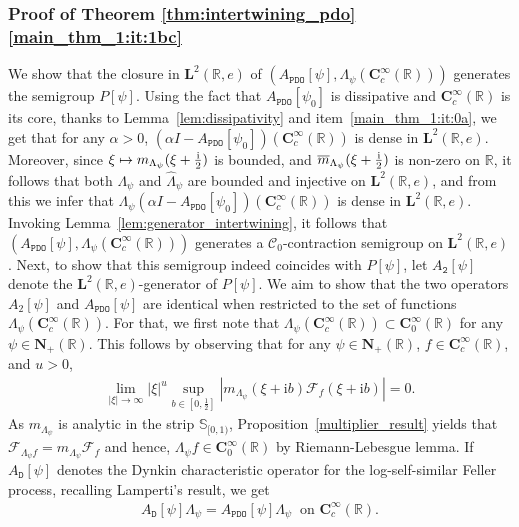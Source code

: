 \documentclass[12pt]{amsart}
\newcommand{\hptg}[2]{\hypertarget{#1}{#2}}
\numberwithin{equation}{section}
\newcommand{\bb}{\mathbb}
\newcommand{\cc}{\mathcal}
\newcommand{\ttt}{\mathtt}
\newcommand{\bmrm}[2][2]{\mathbf{#2}^{#1}}
\newcommand{\fou}{\mathcal{F}}
\newcommand{\C}{\mathbf{C}}
\renewcommand{\i}{\mathrm{i}}
\newcommand{\LRe}{\bmrm{L}(\bb{R},e)}
\theoremstyle{definition}
\theoremstyle{assump}
\theoremstyle{remark}
\begin{document}
{\subsubsection{Proof of Theorem \ref{thm:intertwining_pdo}\eqref{main_thm_1:it:1bc}}
 We  show that the closure in $\LRe$ of $(A_\ttt{PDO}[\psi],\Lambda_\psi(\C^\infty_c(\bb R)))$ generates the semigroup $P[\psi]$. Using the fact that $A_\ttt{PDO}[\psi_0]$ is dissipative and $\C^\infty_c(\bb{R})$ is its core, thanks to Lemma~\ref{lem:dissipativity} and item~\ref{main_thm_1:it:0a}, we get that for any $\alpha>0$, $(\alpha I-A_\ttt{PDO}[\psi_0])(\C^\infty_c(\bb{R}))$ is dense in $\bmrm{L}(\bb{R},e)$. \hptg{C45}{Moreover, since  $\xi \mapsto m_{\Lambda_\psi}(\xi+\frac{{\rm{i}}}{2})$ is bounded, and  $\overline{m}_{\Lambda_\psi}(\xi+\frac{{\rm{i}}}{2})$ is non-zero on $\bb{R}$, it follows that both $\Lambda_\psi$ and $\widehat{\Lambda}_\psi$ are bounded and injective on $\bmrm{L}(\bb{R},e)$, and from this we infer that $\Lambda_\psi (\alpha I-A_\ttt{PDO}[\psi_0])(\C^\infty_c(\bb{R}))$ is dense in $\bmrm{L}(\bb{R},e)$.} Invoking Lemma~\ref{lem:generator_intertwining}, it follows that $(A_\ttt{PDO}[\psi],\Lambda_\psi(\C^\infty_c(\bb R)))$ generates a $\cc{C}_0$-contraction semigroup on $\LRe$. Next, to show that this semigroup indeed coincides with $P[\psi]$, let $A_\ttt{2}[\psi]$ denote the $\LRe$-generator of $P[\psi]$. \hptg{C47}{We aim to show that the two operators $A_2[\psi]$ and $A_\ttt{PDO}[\psi]$ are identical when restricted to the set of functions $\Lambda_\psi(\C^\infty_c(\bb R))$. For that, we first note that $\Lambda_\psi(\C^\infty_c(\bb R))\subset\C^\infty_0(\bb R)$ for any $\psi\in\mathbf{N}_+(\bb R)$. This follows by observing that for any $\psi\in\mathbf{N}_+(\bb R)$, $f\in\C^\infty_c(\bb R)$, and $u>0$,
\begin{align*}
	\lim_{|\xi|\to\infty}|\xi|^u \sup_{b\in [0,\frac{1}{2}]}\left|m_{\Lambda_\psi}(\xi+\i b)\fou_{f}(\xi+\i b)\right|=0.
\end{align*}
As $m_{\Lambda_\psi}$ is analytic in the strip $\bb{S}_{[0,1)}$, Proposition~\ref{multiplier_result} yields that $\fou_{\Lambda_\psi f}=m_{\Lambda_\psi}\fou_f$ and hence, $\Lambda_\psi f\in\C^\infty_0(\bb R)$ by Riemann-Lebesgue lemma. If $A_\ttt{D}[\psi]$ denotes the  Dynkin characteristic operator for the log-self-similar Feller process, recalling Lamperti's result, we get
\begin{align*}
A_\ttt{D}[\psi]\Lambda_\psi  =A_\ttt{PDO}[\psi]\Lambda_\psi   \ \mbox{ on }  \C^\infty_c(\bb{R}).
\end{align*}}
}
\end{document}
